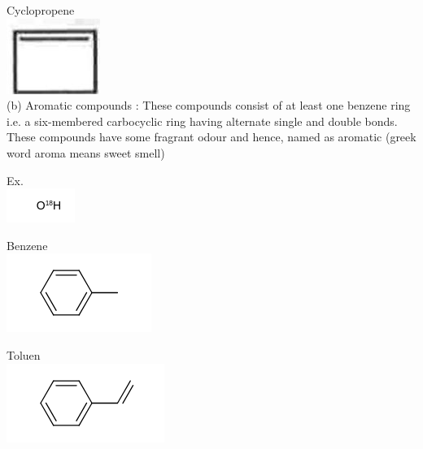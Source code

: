 \documentclass[10pt]{article}
\begin{document}
Cyclopropene\\
\includegraphics[max width=\textwidth, center]{2025_01_28_8470952b98110cec3aabg-008}\\
(b) Aromatic compounds : These compounds consist of at least one benzene ring i.e. a six-membered carbocyclic ring having alternate single and double bonds. These compounds have some fragrant odour and hence, named as aromatic (greek word aroma means sweet smell)

Ex.\\
\includegraphics{smile-3bb19601986b44018fefc1e913d04c6d62757666}

Benzene\\
\includegraphics{smile-4dd4fcd25dd7941ce42ac797c95a69325091235d}

Toluen\\
\includegraphics{smile-b6896f1ac27926901a647e747eb8794a5fed872a}
\end{document}
